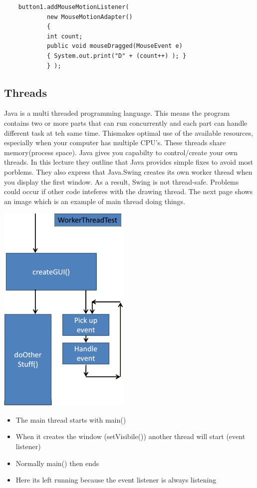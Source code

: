 \documentclass{article}
\begin{document}
\begin{lstlisting}
	button1.addMouseMotionListener(
			new MouseMotionAdapter()
			{
			int count;
			public void mouseDragged(MouseEvent e)
			{ System.out.print("D" + (count++) ); }
			} );
\end{lstlisting}

\subsection{Threads}

Java is a multi threaded programming language. This means the program contains two or more parts that can run
concurrently and each part can handle different task at teh same time. Thismakes optimal use of the available
resources, especially when your computer has multiple CPU's. These threads share memory(process space).
Java gives you capabilty to control/create your own threads. In this lecture they outline that Java provides simple fixes to avoid most porblems. They also express that Java.Swing creates its own worker thread when you 
display the first window. As a result, Swing is not thread-safe. Problems could occur if other code inteferes
with the drawing thread. The next page shows an image which is an example of main thread doing things.

\begin{center}
\includegraphics{threading.png}
\end{center}

\begin{itemize}
\item The main thread starts with main()
\item When it creates the window (setVisibile()) another thread will start (event listener)
\item Normally main() then ends
\item Here its left running because the event listener is always listening
\end{itemize}
\end{document}
